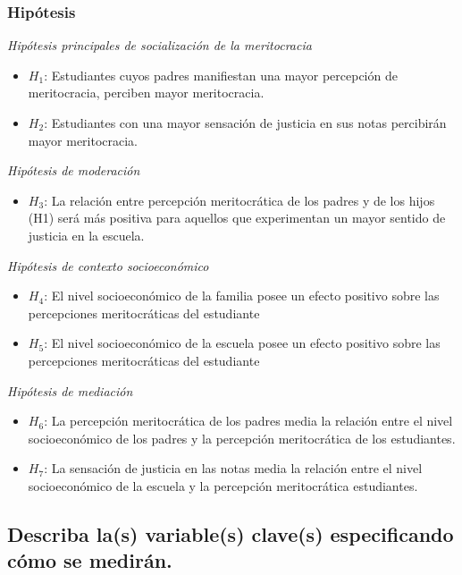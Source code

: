 \documentclass[
  12pt,
]{article}
\providecommand{\tightlist}{%
  \setlength{\itemsep}{0pt}\setlength{\parskip}{0pt}}
\begin{document}
\hypertarget{hipuxf3tesis}{%
\subsubsection{Hipótesis}\label{hipuxf3tesis}}

\emph{Hipótesis principales de socialización de la meritocracia}

\begin{itemize}
\item
  \(H_1\): Estudiantes cuyos padres manifiestan una mayor percepción de
  meritocracia, perciben mayor meritocracia.
\item
  \(H_2\): Estudiantes con una mayor sensación de justicia en sus notas
  percibirán mayor meritocracia.
\end{itemize}

\emph{Hipótesis de moderación}

\begin{itemize}
\tightlist
\item
  \(H_3\): La relación entre percepción meritocrática de los padres y de
  los hijos (H1) será más positiva para aquellos que experimentan un
  mayor sentido de justicia en la escuela.
\end{itemize}

\emph{Hipótesis de contexto socioeconómico}

\begin{itemize}
\item
  \(H_4\): El nivel socioeconómico de la familia posee un efecto
  positivo sobre las percepciones meritocráticas del estudiante
\item
  \(H_5\): El nivel socioeconómico de la escuela posee un efecto
  positivo sobre las percepciones meritocráticas del estudiante
\end{itemize}

\emph{Hipótesis de mediación}

\begin{itemize}
\item
  \(H_6\): La percepción meritocrática de los padres media la relación
  entre el nivel socioeconómico de los padres y la percepción
  meritocrática de los estudiantes.
\item
  \(H_7\): La sensación de justicia en las notas media la relación entre
  el nivel socioeconómico de la escuela y la percepción meritocrática
  estudiantes.
\end{itemize}

\hypertarget{describa-las-variables-claves-especificando-cuxf3mo-se-mediruxe1n.}{%
\subsection{Describa la(s) variable(s) clave(s) especificando cómo se
medirán.}\label{describa-las-variables-claves-especificando-cuxf3mo-se-mediruxe1n.}}
\end{document}
